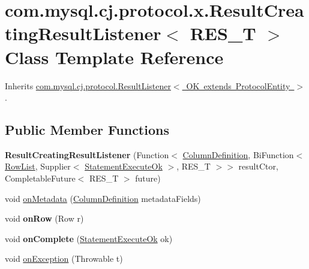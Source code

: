 \hypertarget{classcom_1_1mysql_1_1cj_1_1protocol_1_1x_1_1_result_creating_result_listener}{}\section{com.\+mysql.\+cj.\+protocol.\+x.\+Result\+Creating\+Result\+Listener$<$ R\+E\+S\+\_\+T $>$ Class Template Reference}
\label{classcom_1_1mysql_1_1cj_1_1protocol_1_1x_1_1_result_creating_result_listener}


Inherits \mbox{\hyperlink{interfacecom_1_1mysql_1_1cj_1_1protocol_1_1_result_listener}{com.\+mysql.\+cj.\+protocol.\+Result\+Listener$<$ O\+K extends Protocol\+Entity $>$}}.

\subsection*{Public Member Functions}
\begin{DoxyCompactItemize}
\item 
\mbox{\label{classcom_1_1mysql_1_1cj_1_1protocol_1_1x_1_1_result_creating_result_listener_a1ffb4216e90c5ce744b6a13b877e7aca}} 
{\bfseries Result\+Creating\+Result\+Listener} (Function$<$ \mbox{\hyperlink{interfacecom_1_1mysql_1_1cj_1_1protocol_1_1_column_definition}{Column\+Definition}}, Bi\+Function$<$ \mbox{\hyperlink{interfacecom_1_1mysql_1_1cj_1_1result_1_1_row_list}{Row\+List}}, Supplier$<$ \mbox{\hyperlink{classcom_1_1mysql_1_1cj_1_1protocol_1_1x_1_1_statement_execute_ok}{Statement\+Execute\+Ok}} $>$, R\+E\+S\+\_\+T $>$$>$ result\+Ctor, Completable\+Future$<$ R\+E\+S\+\_\+T $>$ future)
\item 
void \mbox{\hyperlink{classcom_1_1mysql_1_1cj_1_1protocol_1_1x_1_1_result_creating_result_listener_a453e531bc60f8e74d1f19ae2ddd2fd37}{on\+Metadata}} (\mbox{\hyperlink{interfacecom_1_1mysql_1_1cj_1_1protocol_1_1_column_definition}{Column\+Definition}} metadata\+Fields)
\item 
\mbox{\label{classcom_1_1mysql_1_1cj_1_1protocol_1_1x_1_1_result_creating_result_listener_a3b582384d167ddc242cffd7805de375c}} 
void {\bfseries on\+Row} (Row r)
\item 
\mbox{\label{classcom_1_1mysql_1_1cj_1_1protocol_1_1x_1_1_result_creating_result_listener_a32f73b53b927ed85fbd03d4f8d18eaf0}} 
void {\bfseries on\+Complete} (\mbox{\hyperlink{classcom_1_1mysql_1_1cj_1_1protocol_1_1x_1_1_statement_execute_ok}{Statement\+Execute\+Ok}} ok)
\item 
void \mbox{\hyperlink{classcom_1_1mysql_1_1cj_1_1protocol_1_1x_1_1_result_creating_result_listener_af44c32d4ea694aea93998ebbba341605}{on\+Exception}} (Throwable t)
\end{DoxyCompactItemize}


